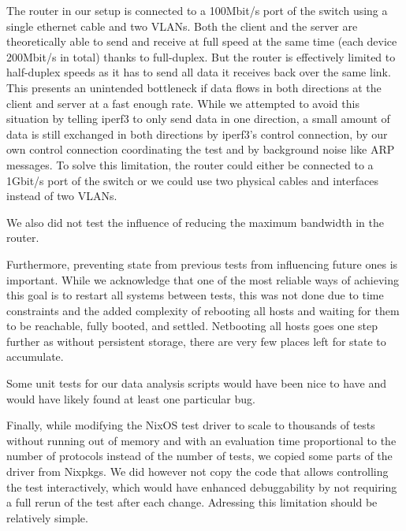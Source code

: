 The router in our setup is connected to a 100Mbit/s port of the switch using a single ethernet cable and two VLANs.
Both the client and the server are theoretically able to send and receive at full speed at the same time (each device 200Mbit/s in total) thanks to full-duplex.
But the router is effectively limited to half-duplex speeds as it has to send all data it receives back over the same link.
This presents an unintended bottleneck if data flows in both directions at the client and server at a fast enough rate.
While we attempted to avoid this situation by telling iperf3 to only send data in one direction, a small amount of data is still exchanged in both directions by iperf3's control connection, by our own control connection coordinating the test and by background noise like ARP messages.
To solve this limitation, the router could either be connected to a 1Gbit/s port of the switch or we could use two physical cables and interfaces instead of two VLANs.

We also did not test the influence of reducing the maximum bandwidth in the router.

Furthermore, preventing state from previous tests from influencing future ones is important.
While we acknowledge that one of the most reliable ways of achieving this goal is to restart all systems between tests, this was not done due to time constraints and the added complexity of rebooting all hosts and waiting for them to be reachable, fully booted, and settled.
Netbooting all hosts goes one step further as without persistent storage, there are very few places left for state to accumulate.

Some unit tests for our data analysis scripts would have been nice to have and would have likely found at least one particular bug.

Finally, while modifying the NixOS test driver to scale to thousands of tests without running out of memory and with an evaluation time proportional to the number of protocols instead of the number of tests, we copied some parts of the driver from Nixpkgs.
We did however not copy the code that allows controlling the test interactively, which would have enhanced debuggability by not requiring a full rerun of the test after each change.
Adressing this limitation should be relatively simple.


